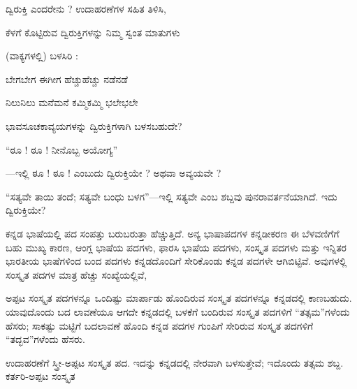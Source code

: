 
\vspace{2.5pt plus 3pt minus 0.5pt}\noindent\hspace*{1.2em}\hspace{0.55em}ದ್ವಿರುಕ್ತಿ ಎಂದರೇನು ? ಉದಾಹರಣೆಗಳ ಸಹಿತ ತಿಳಿಸಿ,\par

\vspace{2.5pt plus 3pt minus 0.5pt}\noindent\hspace*{1.2em}\hspace{0.55em}ಕೆಳಗೆ ಕೊಟ್ಟಿರುವ ದ್ವಿರುಕ್ತಿಗಳನ್ನು ನಿಮ್ಮ ಸ್ವಂತ ಮಾತುಗಳು\par

\indent (ವಾಕ್ಯಗಳಲ್ಲಿ) ಬಳಸಿರಿ :\par

\indent ಬೇಗಬೇಗ ಈಗೀಗ ಹೆಚ್ಚುಹೆಚ್ಚು ನಡೆನಡೆ\par

\indent ನಿಲುನಿಲು ಮನೆಮನೆ  ಕಮ್ಮಿಕಮ್ಮಿ ಭಲೇಭಲೇ\par

\vspace{2.5pt plus 3pt minus 0.5pt}\noindent\hspace*{1.2em}\hspace{0.55em}ಭಾವಸೂಚಕಾವ್ಯಯಗಳನ್ನು ದ್ವಿರುಕ್ತಿಗಳಾಗಿ ಬಳಸಬಹುದೇ?\par

\vspace{2.5pt plus 3pt minus 0.5pt}\noindent\hspace*{1.2em}\hspace{0.55em}“ಠೂ ! ಠೂ ! ನೀನೊಬ್ಬ ಅಯೋಗ್ಯ”\par

\indent —ಇಲ್ಲಿ ಠೂ ! ಠೂ ! ಎಂಬುದು ದ್ವಿರುಕ್ತಿಯೇ ? ಅಥವಾ ಅವ್ಯಯವೇ ?\par

\vspace{2.5pt plus 3pt minus 0.5pt}\noindent\hspace*{1.2em}\hspace{0.55em}“ಸತ್ಯವೇ ತಾಯಿ ತಂದೆ; ಸತ್ಯವೇ ಬಂಧು ಬಳಗ”—ಇಲ್ಲಿ ಸತ್ಯವೇ ಎಂಬ ಶಬ್ದವು ಪುನರಾವರ್ತನೆಯಾಗಿದೆ. ಇದು ದ್ವಿರುಕ್ತಿಯೇ?\par


\indent ಕನ್ನಡ ಭಾಷೆಯಲ್ಲಿ ಪದ ಸಂಪತ್ತು ಬರುಬರುತ್ತಾ ಹೆಚ್ಚುತ್ತಿದೆ. ಅನ್ಯ ಭಾಷಾಪದಗಳ ಕನ್ನಡೀಕರಣ ಈ ಬೆಳವಣಿಗೆಗೆ ಬಹು ಮುಖ್ಯ ಕಾರಣ, ಆಂಗ್ಲ ಭಾಷೆಯ ಪದಗಳು, ಫಾರಸಿ ಭಾಷೆಯ ಪದಗಳು, ಸಂಸ್ಕೃತ ಪದಗಳು ಮತ್ತು ಇನ್ನಿತರ ಭಾರತೀಯ ಭಾಷೆಗಳಿಂದ ಬಂದ ಪದಗಳು ಕನ್ನಡದೊಂದಿಗೆ ಸೇರಿಕೊಂಡು ಕನ್ನಡ ಪದಗಳೇ ಆಗಿಬಿಟ್ಟಿವೆ. ಅವುಗಳಲ್ಲಿ ಸಂಸ್ಕೃತ ಪದಗಳ ಮಾತ್ರ ಹೆಚ್ಚು ಸಂಖ್ಯೆಯಲ್ಲಿವೆ,\par

\indent ಅಪ್ಪಟ ಸಂಸ್ಕೃತ ಪದಗಳನ್ನೂ ಒಂದಿಷ್ಟು ಮಾರ್ಪಾಡು ಹೊಂದಿರುವ ಸಂಸ್ಕೃತ ಪದಗಳನ್ನೂ ಕನ್ನಡದಲ್ಲಿ ಕಾಣಬಹುದು. ಯಾವುದೊಂದು ಬದ ಲಾವಣೆಯೂ ಆಗದೇ ಕನ್ನಡದಲ್ಲಿ ಬಳಕೆಗೆ ಬಂದಿರುವ ಸಂಸ್ಕೃತ ಪದಗಳಿಗೆ “ತತ್ಸಮ”ಗಳೆಂದು ಹೆಸರು; ಸಾಕಷ್ಟು ಮಟ್ಟಿಗೆ ಬದಲಾವಣೆ ಹೊಂದಿ ಕನ್ನಡ ಪದಗಳ ಗುಂಪಿಗೆ ಸೇರಿರುವ ಸಂಸ್ಕೃತ ಪದಗಳಿಗೆ “ತದ್ಭವ”ಗಳೆಂದು ಹೆಸರು.\par

\indent ಉದಾಹರಣೆಗೆ ಸ್ತ್ರೀ-ಅಪ್ಪಟ ಸಂಸ್ಕೃತ ಪದ. ಇದನ್ನು ಕನ್ನಡದಲ್ಲಿ ನೇರವಾಗಿ ಬಳಸುತ್ತೇವೆ; ಇದೊಂದು ತತ್ಸಮ ಶಬ್ದ. ಕರ್ತರಿ-ಅಪ್ಪಟ ಸಂಸ್ಕೃತ\kbvcontinues
